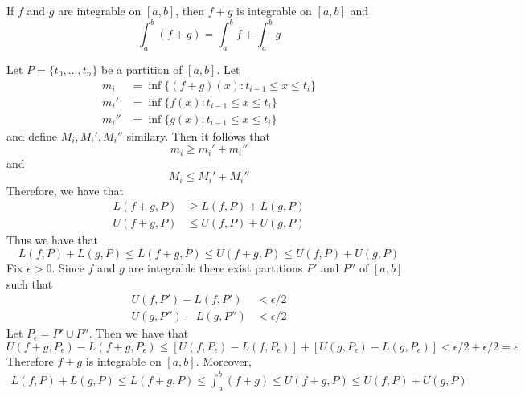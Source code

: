 \documentclass[12pt]{report}
\begin{document}
\begin{thm}{}{}
    If $f$ and $g$ are integrable on $[a,b]$, then $f+g$ is integrable on $[a,b]$ and \begin{equation}
        \int_a^b(f+g) = \int_a^bf+\int_a^bg
    \end{equation}
\end{thm}
\begin{proof*}{}{}
    Let $P = \{t_0,...,t_n\}$ be a partition of $[a,b]$. Let \begin{align*}
        m_i &= \inf\{(f+g)(x):t_{i-1} \leq x \leq t_i\} \\
        m_i'&= \inf\{f(x):t_{i-1} \leq x \leq t_i\} \\
        m_i''&= \inf\{g(x):t_{i-1} \leq x \leq t_i\} 
    \end{align*}
    and define $M_i,M_i',M_i''$ similary. Then it follows that \begin{equation*}
        m_i \geq m_i' + m_i''
    \end{equation*}
    and \begin{equation*}
        M_i \leq M_i' + M_i''
    \end{equation*}
    Therefore, we have that \begin{align*}
        L(f+g,P) &\geq L(f,P) + L(g,P) \\
        U(f+g,P) &\leq U(f,P) + U(g,P)
    \end{align*}
    Thus we have that \begin{equation*}
        L(f,P) + L(g,P) \leq L(f+g,P) \leq U(f+g,P) \leq U(f,P) + U(g,P)
    \end{equation*}
    Fix $\epsilon > 0$. Since $f$ and $g$ are integrable there exist partitions $P'$ and $P''$ of $[a,b]$ such that \begin{align*}
        U(f,P') - L(f,P') &< \epsilon/2 \\
        U(g,P'') - L(g,P'') &< \epsilon/2
    \end{align*}
    Let $P_{\epsilon} = P' \cup P''$. Then we have that \begin{equation*}
        U(f+g,P_{\epsilon}) - L(f+g,P_{\epsilon}) \leq [U(f,P_{\epsilon}) - L(f,P_{\epsilon})] + [U(g,P_{\epsilon}) - L(g,P_{\epsilon})] < \epsilon/2 + \epsilon/2 = \epsilon
    \end{equation*}
    Therefore $f+g$ is integrable on $[a,b]$. Moreover, \begin{align*}
        L(f,P) + L(g,P) \leq L(f+g,P) \leq \int_a^b(f+g) \leq U(f+g,P) \leq U(f,P) + U(g,P)
    \end{align*}

\end{proof*}
\end{document}
